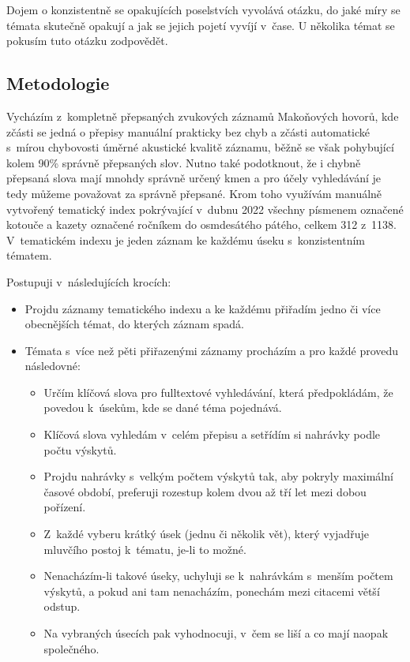 Dojem o konzistentně se opakujících poselstvích vyvolává otázku, do jaké míry se
témata skutečně opakují a jak se jejich pojetí vyvíjí v~čase. U několika témat
se pokusím tuto otázku zodpovědět.

\subsection{Metodologie}

Vycházím z~kompletně přepsaných zvukových záznamů Makoňových hovorů, kde zčásti
se jedná o přepisy manuální prakticky bez chyb a zčásti automatické s~mírou
chybovosti úměrné akustické kvalitě záznamu, běžně se však pohybující kolem 90\%
správně přepsaných slov. Nutno také podotknout, že i chybně přepsaná slova mají
mnohdy správně určený kmen a pro účely vyhledávání je tedy můžeme považovat za
správně přepsané. Krom toho využívám manuálně vytvořený tematický index
pokrývající v~dubnu 2022 všechny písmenem označené kotouče a kazety označené
ročníkem do osmdesátého pátého, celkem 312 z~1138. V~tematickém indexu je jeden
záznam ke každému úseku s~konzistentním tématem.

Postupuji v~následujících krocích:
\begin{itemize}
\item{
Projdu záznamy tematického indexu a ke každému přiřadím jedno či více
obecnějších témat, do kterých záznam spadá.
}
\item{
Témata s~více než pěti přiřazenými záznamy procházím a pro každé provedu
následovné:
\begin{itemize}
\item{
Určím klíčová slova pro fulltextové vyhledávání, která předpokládám, že povedou
k~úsekům, kde se dané téma pojednává.
}
\item{
Klíčová slova vyhledám v~celém přepisu a setřídím si nahrávky podle počtu
výskytů.
}
\item{
Projdu nahrávky s~velkým počtem výskytů tak, aby pokryly maximální časové
období, preferuji rozestup kolem dvou až tří let mezi dobou pořízení.
}
\item{
Z~každé vyberu krátký úsek (jednu či několik vět), který vyjadřuje mluvčího
postoj k~tématu, je-li to možné.
}
\item{
Nenacházím-li takové úseky, uchyluji se k~nahrávkám s~menším počtem výskytů, a
pokud ani tam nenacházím, ponechám mezi citacemi větší odstup.
}
\item{
Na vybraných úsecích pak vyhodnocuji, v~čem se liší a co mají naopak
společného.
}
\end{itemize}
}
\end{itemize}

